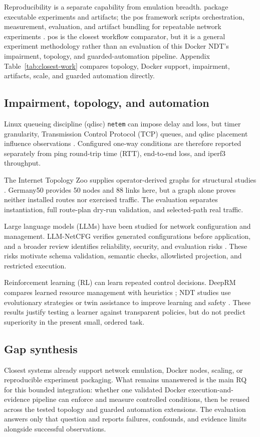 Reproducibility is a separate capability from emulation breadth. \citet{handigol2012reproducible} package executable experiments and artifacts; the pos framework scripts orchestration, measurement, evaluation, and artifact bundling for repeatable network experiments \citep{gallenmuller2021pos}. pos is the closest workflow comparator, but it is a general experiment methodology rather than an evaluation of this Docker NDT's impairment, topology, and guarded-automation pipeline. Appendix Table~\ref{tab:closest-work} compares topology, Docker support, impairment, artifacts, scale, and guarded automation directly.

\subsection{Impairment, topology, and automation}

Linux queueing discipline (qdisc) \texttt{netem} can impose delay and loss, but timer granularity, Transmission Control Protocol (TCP) queues, and qdisc placement influence observations \citep{iproute2netem}. Configured one-way conditions are therefore reported separately from ping round-trip time (RTT), end-to-end loss, and iperf3 throughput.

The Internet Topology Zoo supplies operator-derived graphs for structural studies \citep{knight2011topologyzoo}. Germany50 provides 50 nodes and 88 links here, but a graph alone proves neither installed routes nor exercised traffic. The evaluation separates instantiation, full route-plan dry-run validation, and selected-path real traffic.

Large language models (LLMs) have been studied for network configuration and management. LLM-NetCFG verifies generated configurations before application, and a broader review identifies reliability, security, and evaluation risks \citep{lira2025llmnetcfg,liu2025llmnetworking}. These risks motivate schema validation, semantic checks, allowlisted projection, and restricted execution.

Reinforcement learning (RL) can learn repeated control decisions. DeepRM compares learned resource management with heuristics \citep{mao2016deeprm}; NDT studies use evolutionary strategies or twin assistance to improve learning and safety \citep{guemes2022accelerating,cheng2025dtrl}. These results justify testing a learner against transparent policies, but do not predict superiority in the present small, ordered task.

\subsection{Gap synthesis}

Closest systems already support network emulation, Docker nodes, scaling, or reproducible experiment packaging. What remains unanswered is the main RQ for this bounded integration: whether one validated Docker execution-and-evidence pipeline can enforce and measure controlled conditions, then be reused across the tested topology and guarded automation extensions. The evaluation answers only that question and reports failures, confounds, and evidence limits alongside successful observations.
